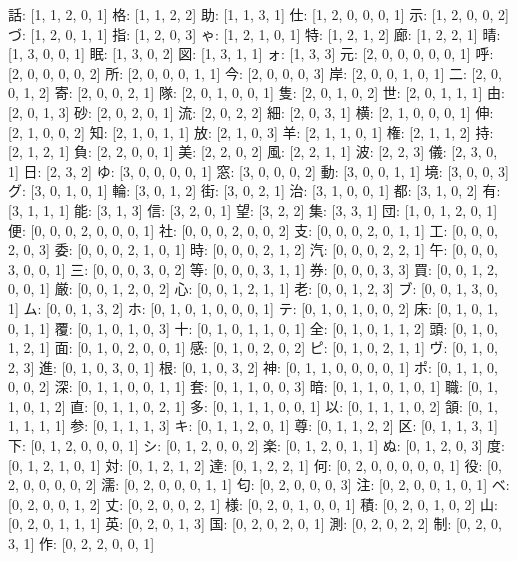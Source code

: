 \documentclass[a4paper,10pt,ngerman]{scrartcl}
\begin{document}
話: [1, 1, 2, 0, 1]
格: [1, 1, 2, 2]
助: [1, 1, 3, 1]
仕: [1, 2, 0, 0, 0, 1]
示: [1, 2, 0, 0, 2]
づ: [1, 2, 0, 1, 1]
指: [1, 2, 0, 3]
ゃ: [1, 2, 1, 0, 1]
特: [1, 2, 1, 2]
廊: [1, 2, 2, 1]
晴: [1, 3, 0, 0, 1]
眠: [1, 3, 0, 2]
図: [1, 3, 1, 1]
ォ: [1, 3, 3]
元: [2, 0, 0, 0, 0, 0, 1]
呼: [2, 0, 0, 0, 0, 2]
所: [2, 0, 0, 0, 1, 1]
今: [2, 0, 0, 0, 3]
岸: [2, 0, 0, 1, 0, 1]
二: [2, 0, 0, 1, 2]
寄: [2, 0, 0, 2, 1]
隊: [2, 0, 1, 0, 0, 1]
隻: [2, 0, 1, 0, 2]
世: [2, 0, 1, 1, 1]
由: [2, 0, 1, 3]
砂: [2, 0, 2, 0, 1]
流: [2, 0, 2, 2]
細: [2, 0, 3, 1]
横: [2, 1, 0, 0, 0, 1]
伸: [2, 1, 0, 0, 2]
知: [2, 1, 0, 1, 1]
放: [2, 1, 0, 3]
羊: [2, 1, 1, 0, 1]
権: [2, 1, 1, 2]
持: [2, 1, 2, 1]
負: [2, 2, 0, 0, 1]
美: [2, 2, 0, 2]
風: [2, 2, 1, 1]
波: [2, 2, 3]
儀: [2, 3, 0, 1]
日: [2, 3, 2]
ゆ: [3, 0, 0, 0, 0, 1]
窓: [3, 0, 0, 0, 2]
動: [3, 0, 0, 1, 1]
境: [3, 0, 0, 3]
グ: [3, 0, 1, 0, 1]
輪: [3, 0, 1, 2]
街: [3, 0, 2, 1]
治: [3, 1, 0, 0, 1]
都: [3, 1, 0, 2]
有: [3, 1, 1, 1]
能: [3, 1, 3]
信: [3, 2, 0, 1]
望: [3, 2, 2]
集: [3, 3, 1]
団: [1, 0, 1, 2, 0, 1]
便: [0, 0, 0, 2, 0, 0, 0, 1]
社: [0, 0, 0, 2, 0, 0, 2]
支: [0, 0, 0, 2, 0, 1, 1]
工: [0, 0, 0, 2, 0, 3]
委: [0, 0, 0, 2, 1, 0, 1]
時: [0, 0, 0, 2, 1, 2]
汽: [0, 0, 0, 2, 2, 1]
午: [0, 0, 0, 3, 0, 0, 1]
三: [0, 0, 0, 3, 0, 2]
等: [0, 0, 0, 3, 1, 1]
券: [0, 0, 0, 3, 3]
買: [0, 0, 1, 2, 0, 0, 1]
厳: [0, 0, 1, 2, 0, 2]
心: [0, 0, 1, 2, 1, 1]
老: [0, 0, 1, 2, 3]
ブ: [0, 0, 1, 3, 0, 1]
ム: [0, 0, 1, 3, 2]
ホ: [0, 1, 0, 1, 0, 0, 0, 1]
テ: [0, 1, 0, 1, 0, 0, 2]
床: [0, 1, 0, 1, 0, 1, 1]
覆: [0, 1, 0, 1, 0, 3]
十: [0, 1, 0, 1, 1, 0, 1]
全: [0, 1, 0, 1, 1, 2]
頭: [0, 1, 0, 1, 2, 1]
面: [0, 1, 0, 2, 0, 0, 1]
感: [0, 1, 0, 2, 0, 2]
ピ: [0, 1, 0, 2, 1, 1]
ヴ: [0, 1, 0, 2, 3]
進: [0, 1, 0, 3, 0, 1]
根: [0, 1, 0, 3, 2]
神: [0, 1, 1, 0, 0, 0, 0, 1]
ポ: [0, 1, 1, 0, 0, 0, 2]
深: [0, 1, 1, 0, 0, 1, 1]
套: [0, 1, 1, 0, 0, 3]
暗: [0, 1, 1, 0, 1, 0, 1]
職: [0, 1, 1, 0, 1, 2]
直: [0, 1, 1, 0, 2, 1]
多: [0, 1, 1, 1, 0, 0, 1]
以: [0, 1, 1, 1, 0, 2]
頷: [0, 1, 1, 1, 1, 1]
参: [0, 1, 1, 1, 3]
キ: [0, 1, 1, 2, 0, 1]
尊: [0, 1, 1, 2, 2]
区: [0, 1, 1, 3, 1]
下: [0, 1, 2, 0, 0, 0, 1]
シ: [0, 1, 2, 0, 0, 2]
楽: [0, 1, 2, 0, 1, 1]
ぬ: [0, 1, 2, 0, 3]
度: [0, 1, 2, 1, 0, 1]
対: [0, 1, 2, 1, 2]
達: [0, 1, 2, 2, 1]
何: [0, 2, 0, 0, 0, 0, 0, 1]
役: [0, 2, 0, 0, 0, 0, 2]
濡: [0, 2, 0, 0, 0, 1, 1]
匂: [0, 2, 0, 0, 0, 3]
注: [0, 2, 0, 0, 1, 0, 1]
ベ: [0, 2, 0, 0, 1, 2]
丈: [0, 2, 0, 0, 2, 1]
様: [0, 2, 0, 1, 0, 0, 1]
積: [0, 2, 0, 1, 0, 2]
山: [0, 2, 0, 1, 1, 1]
英: [0, 2, 0, 1, 3]
国: [0, 2, 0, 2, 0, 1]
測: [0, 2, 0, 2, 2]
制: [0, 2, 0, 3, 1]
作: [0, 2, 2, 0, 0, 1]
\end{document}
